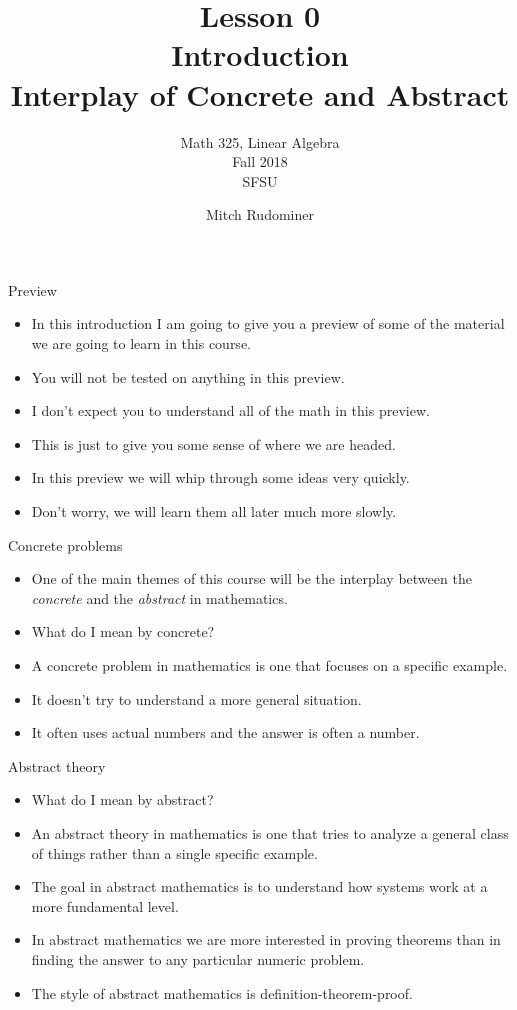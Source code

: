 \documentclass{beamer}
\title{Lesson 0 \\ Introduction \\ Interplay of Concrete and Abstract}
\subtitle{Math 325, Linear Algebra \\ Fall 2018 \\ SFSU}
\author{Mitch Rudominer}
\date{}
\begin{document}
\begin{frame}
  \titlepage
\end{frame}


\begin{frame}{Preview}
\begin{itemize}
\item In this introduction I am going to give you a preview of some of the material we are going
to learn in this course.
\item You will not be tested on anything in this preview.
\item I don't expect you to understand all of the math in this preview.
\item This is just to give you some sense of where we are headed.
\item In this preview we will whip through some ideas very quickly.
\item Don't worry, we will learn them all later much more slowly.
\end{itemize}
\end{frame}

\begin{frame}{Concrete problems}

  \begin{itemize}
  \item  One of the main themes of this course will be the interplay between
  the \emph{concrete} and the \emph{abstract} in mathematics.
  \item What do I mean by concrete?
  \item A concrete problem in mathematics is one that focuses on a specific example.
  \item It doesn't try to understand a more general situation.
  \item It often uses actual numbers and the answer is often a number.
  \end{itemize}

\end{frame}

\begin{frame}{Abstract theory}

  \begin{itemize}
  \item What do I mean by abstract?
  \item An abstract theory in mathematics is one that tries to analyze a general class of things rather than a single specific example.
  \item The goal in abstract mathematics is to understand how systems work at a more fundamental level.
  \item In abstract mathematics we are more interested in proving theorems than in finding the
  answer to any particular numeric problem.
  \item The style of abstract mathematics is definition-theorem-proof.
  \end{itemize}

\end{frame}
\end{document}
